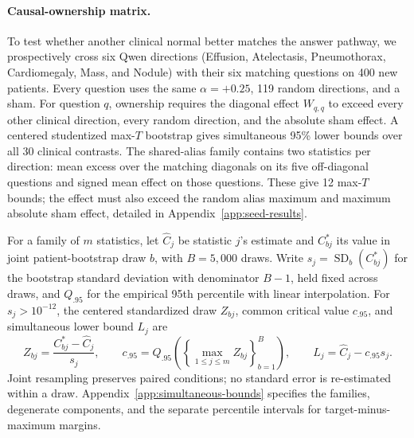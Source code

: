 \paragraph{Causal-ownership matrix.}
To test whether another clinical normal better matches the answer pathway, we prospectively cross six Qwen directions (Effusion, Atelectasis, Pneumothorax, Cardiomegaly, Mass, and Nodule) with their six matching questions on 400 new patients. Every question uses the same $\alpha=+0.25$, 119 random directions, and a sham. For question $q$, ownership requires the diagonal effect $W_{q,q}$ to exceed every other clinical direction, every random direction, and the absolute sham effect. A centered studentized max-$T$ bootstrap gives simultaneous 95\% lower bounds over all 30 clinical contrasts. The shared-alias family contains two statistics per direction: mean excess over the matching diagonals on its five off-diagonal questions and signed mean effect on those questions. These give 12 max-$T$ bounds; the effect must also exceed the random alias maximum and maximum absolute sham effect, detailed in Appendix~\ref{app:seed-results}.

For a family of $m$ statistics, let $\widehat C_j$ be statistic $j$'s estimate and $C^*_{bj}$ its value in joint patient-bootstrap draw $b$, with $B=5{,}000$ draws. Write $s_j=\operatorname{SD}_{b}(C^*_{bj})$ for the bootstrap standard deviation with denominator $B-1$, held fixed across draws, and $Q_{.95}$ for the empirical 95th percentile with linear interpolation. For $s_j>10^{-12}$, the centered standardized draw $Z_{bj}$, common critical value $c_{.95}$, and simultaneous lower bound $L_j$ are
\begin{equation}
Z_{bj}=\frac{C^*_{bj}-\widehat C_j}{s_j},\qquad
c_{.95}=Q_{.95}\!\left(\left\{\max_{1\leq j\leq m}Z_{bj}\right\}_{b=1}^{B}\right),\qquad
L_j=\widehat C_j-c_{.95}s_j.
\label{eq:max-t}
\end{equation}
Joint resampling preserves paired conditions; no standard error is re-estimated within a draw. Appendix~\ref{app:simultaneous-bounds} specifies the families, degenerate components, and the separate percentile intervals for target-minus-maximum margins.

